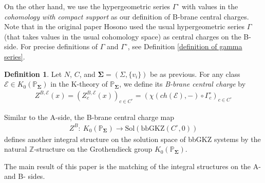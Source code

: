 \documentclass[11pt,reqno]{amsart}
\def\Z {{\mathbb Z}}
\def\PP {{\mathbb P}}
\theoremstyle{definition}
\newtheorem{definition}[theorem]{Definition}
\numberwithin{equation}{section}
\begin{document}
\smallskip

On the other hand, we use the hypergeometric series $\Gamma^{\circ}$ with values in the \textit{cohomology with compact support} as our definition of B-brane central charges. Note that in the original paper \cite{Hosono} Hosono used the usual hypergeometric series $\Gamma$ (that takes values in the usual cohomology space) as central charges on the B-side. For precise definitions of $\Gamma$ and $\Gamma^{\circ}$, see Definition \ref{definition of gamma series}.


\smallskip

\begin{definition}
	Let $N$, $C$, and $\mathbf{\Sigma}=(\Sigma,\{v_i\})$ be as previous. For any class $\mathcal{E}\in K_0(\PP_{\mathbf{\Sigma}})$ in the K-theory of $\PP_{\mathbf{\Sigma}}$, we define its \textit{B-brane central charge} by
	\begin{align*}
		Z^{B,\mathcal{E}}(x)=(Z^{B,\mathcal{E}}_c(x))_{c\in C^{\circ}}=(\chi(ch(\mathcal{E}),-)\circ \Gamma^{\circ}_c)_{c\in C^{\circ}}
	\end{align*}
\end{definition}

\smallskip

Similar to the A-side, the B-brane central charge map
\begin{align*}
	Z^B:\ K_0(\PP_{\mathbf{\Sigma}}) \rightarrow \mathrm{Sol}(\mathrm{bbGKZ}(C^{\circ},0))
\end{align*}
defines another integral structure on the solution space of bbGKZ systems by the natural $\Z$-structure on the Grothendieck group $K_0(\PP_{\mathbf{\Sigma}})$.

\smallskip

The main result of this paper is the matching of the integral structures on the A- and B- sides.

\end{document}
